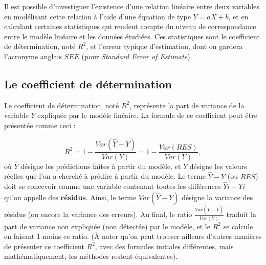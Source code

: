\documentclass[
  french,
]{book}
\begin{document}
Il est possible d'investiguer l'existence d'une relation linéaire entre deux variables en modélisant cette relation à l'aide d'une équation de type \(Y = aX + b\), et en calculant certaines statistiques qui rendent compte du niveau de correspondance entre le modèle linéaire et les données étudiées. Ces statistiques sont le coefficient de détermination, noté \(R^2\), et l'erreur typique d'estimation, dont on gardera l'acronyme anglais \(SEE\) (pour \emph{Standard Error of Estimate}).

\hypertarget{le-coefficient-de-duxe9termination}{%
\subsection{Le coefficient de détermination}\label{le-coefficient-de-duxe9termination}}

Le coefficient de détermination, noté \(R^2\), représente la part de variance de la variable \(Y\) expliquée par le modèle linéaire. La formule de ce coefficient peut être présentée comme ceci :

\[R^2 = 1 - {\frac {Var(\hat{Y} - Y) } {Var(Y)}} = 1 - {\frac {Var(RES)} {Var(Y)}}, \]
où \(\hat{Y}\) désigne les prédictions faites à partir du modèle, et \(Y\) désigne les valeurs réelles que l'on a cherché à prédire à partir du modèle. Le terme \(\hat{Y} - Y\) (ou \(RES\)) doit se concevoir comme une variable contenant toutes les différences \(\hat{Y}{i} - Y{i}\) qu'on appelle des \textbf{résidus}. Ainsi, le terme \({Var(\hat{Y} - Y) }\) désigne la variance des résidus (ou encore la variance des erreurs). Au final, le ratio \({\frac {Var(\hat{Y} - Y) } {Var(Y)}}\) traduit la part de variance non expliquée (non détectée) par le modèle, et le \(R^2\) se calcule en faisant 1 moins ce ratio. (À noter qu'on peut trouver ailleurs d'autres manières de présenter ce coefficient \(R^2\), avec des formules initiales différentes, mais mathématiquement, les méthodes restent équivalentes).
\end{document}
